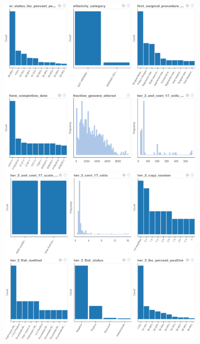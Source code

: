 \begin{figure}
	\includegraphics[width=0.9\textwidth]{NOTEBOOK/IMAGES_EDA/5}
	\includegraphics[width=0.9\textwidth]{NOTEBOOK/IMAGES_EDA/6}
\end{figure}

